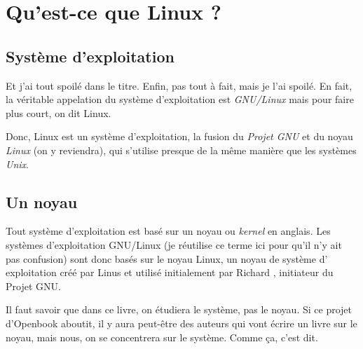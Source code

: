 \chapter{Qu'est-ce que Linux ?}

\section{Système d'exploitation}

Et j'ai tout spoilé dans le titre. Enfin, pas tout à fait, mais je l'ai spoilé.
En fait, la véritable appelation du système d'exploitation est \emph{GNU/Linux}
mais pour faire plus court, on dit Linux.

Donc, Linux est un système d'exploitation, la fusion du \emph{Projet GNU} et du
noyau \emph{Linux} (on y reviendra), qui s'utilise presque de la même manière
que les systèmes \emph{Unix}.

\section{Un noyau}

Tout système d'exploitation est basé sur un noyau ou \emph{kernel} en anglais.
Les systèmes d'exploitation GNU/Linux (je réutilise ce terme ici pour qu'il n'y
ait pas confusion) sont donc basés sur le noyau Linux, un noyau de système d'
exploitation créé par Linus  et utilisé initialement par
Richard , initiateur du Projet GNU.

Il faut savoir que dans ce livre, on étudiera le système, pas le noyau. Si ce
projet d'Openbook aboutit, il y aura peut-être des auteurs qui vont écrire un
livre sur le noyau, mais nous, on se concentrera sur le système. Comme ça, c'est
dit.
